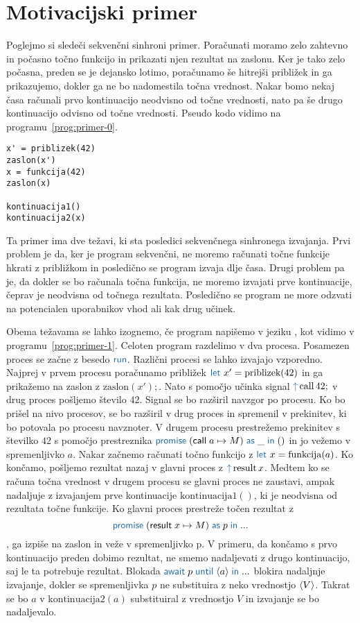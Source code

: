 \section{Motivacijski primer} \label{sec:primeri-aeff}

Poglejmo si sledeči sekvenčni sinhroni primer. Poračunati moramo zelo zahtevno in počasno točno funkcijo in prikazati njen rezultat na zaslonu. Ker je tako zelo počasna, preden se je dejansko lotimo, poračunamo še hitrejši približek in ga prikazujemo, dokler ga ne bo nadomestila točna vrednost. Nakar bomo nekaj časa računali prvo kontinuacijo neodvisno od točne vrednosti, nato pa še drugo kontinuacijo odvisno od točne vrednosti. Pseudo kodo vidimo na programu~\ref{prog:primer-0}.

\begin{lstlisting}[caption={Sinhron sekvečni primer.},label={prog:primer-0},float,floatplacement=H]
x' = priblizek(42)
zaslon(x')
x = funkcija(42)
zaslon(x)

kontinuacija1()
kontinuacija2(x)
\end{lstlisting}

Ta primer ima dve težavi, ki sta posledici sekvenčnega sinhronega izvajanja. Prvi problem je da, ker je program sekvenčni, ne moremo računati točne funkcije hkrati z približkom in posledično se program izvaja dlje časa. Drugi problem pa je, da dokler se bo računala točna funkcija, ne moremo izvajati prve kontinuacije, čeprav je neodvisna od točnega rezultata. Posledično se program ne more odzvati na potencialen uporabnikov vhod ali kak drug učinek.  

Obema težavama se lahko izognemo, če program napišemo v jeziku \aeff, kot vidimo v programu~\ref{prog:primer-1}. Celoten program razdelimo v dva procesa. Posamezen proces se začne z besedo $\tmkw{run}$. Različni procesi se lahko izvajajo vzporedno. Najprej v prvem procesu poračunamo približek $\tmkw{let}\ x' = \text{priblizek}(42)$ in ga prikažemo na zaslon z $\text{zaslon}(x');$. Nato s pomočjo učinka signal $\tmkw{\uparrow}\, \text{call}\,42;$ v drug proces pošljemo število $42$. Signal se bo razširil navzgor po procesu. Ko bo prišel na nivo procesov, se bo razširil v drug proces in spremenil v prekinitev, ki bo potovala po procesu navznoter. V drugem procesu prestrežemo prekinitev s številko $42$ s pomočjo prestreznika $\tmwith{call}{a}{M}{\_}{()}$ in jo vežemo v spremenljivko $a$. Nakar začnemo računati točno funkcijo z $\tmkw{let}\ x = \text{funkcija}(a)$. Ko končamo, pošljemo rezultat nazaj v glavni proces z $\tmkw{\uparrow}\, \text{result}\,x$. Medtem ko se računa točna vrednost v drugem procesu se glavni proces ne zaustavi, ampak nadaljuje z izvajanjem prve kontinuacije $\text{kontinuacija}1()$, ki je neodvisna od rezultata točne funkcije. Ko glavni proces prestreže točen rezultat z $$\tmwith{result}{x}{M}{p}{...}$$, ga izpiše na zaslon in veže v spremenljivko p. V primeru, da končamo s prvo kontinuacijo preden dobimo rezultat, ne smemo nadaljevati z drugo kontinuacijo, saj le ta potrebuje rezultat. Blokada $\tmawait{p}{a}{...}$ blokira nadaljnje izvajanje, dokler se spremenljivka $p$ ne substituira z neko vrednostjo $\langle V \rangle$. Takrat se bo $a$ v $\text{kontinuacija}2(a)$ substituiral z vrednostjo $V$ in izvajanje se bo nadaljevalo.

